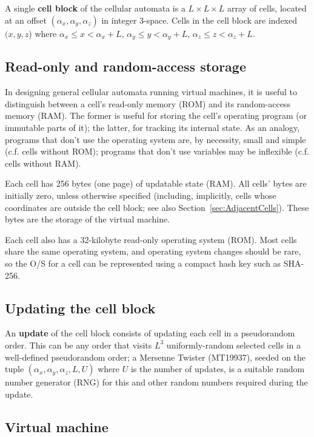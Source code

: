 \documentclass{article}
\begin{document}
A single {\bf cell block} of the cellular automata is a $L \times L \times L$ array of cells,
located at an offset $(\alpha_x,\alpha_y,\alpha_z)$ in integer 3-space.
Cells in the cell block are indexed $(x,y,z$) where
$\alpha_x \leq x < \alpha_x+L$,
$\alpha_y \leq y < \alpha_y+L$,
$\alpha_z \leq z < \alpha_z+L$.

\subsection{Read-only and random-access storage}
\label{sec:Storage}

In designing general cellular automata running virtual machines,
it is useful to distinguish between a cell's read-only memory (ROM)
and its random-access memory (RAM).
The former is useful for storing the cell's operating program (or immutable parts of it); the latter, for tracking its internal state.
As an analogy, programs that don't use the operating system are, by necessity, small and simple (c.f. cells without ROM);
programs that don't use variables may be inflexible (c.f. cells without RAM).

Each cell has 256 bytes (one page) of updatable state (RAM).
All cells' bytes are initially zero, unless otherwise specified
(including, implicitly, cells whose coordinates are outside the cell block; see also Section~\ref{sec:AdjacentCells}).
These bytes are the storage of the virtual machine.

Each cell also has a 32-kilobyte read-only operating system (ROM).
Most cells share the same operating system, and operating system changes should be rare,
so the O/S for a cell can be represented using a compact hash key such as SHA-256.

\subsection{Updating the cell block}
\label{sec:UpdatingCellBlock}

An {\bf update} of the cell block consists of updating each cell in a pseudorandom order.
This can be any order that visits $L^3$ uniformly-random selected cells in a well-defined pseudorandom order;
a Mersenne Twister (MT19937),
seeded on the tuple $(\alpha_x,\alpha_y,\alpha_z,L,U)$ where $U$ is the number of updates,
is a suitable random number generator (RNG) for this and other random numbers required during the update.

\subsection{Virtual machine}
\end{document}
